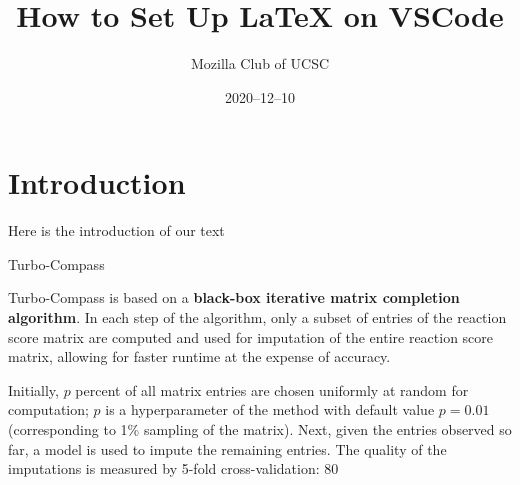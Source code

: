 \documentclass[12pt]{article}
\title{How to Set Up LaTeX on VSCode}
\author{Mozilla Club of UCSC}
\date{2020–12–10}
\begin{document}
\maketitle

\section{Introduction}

Here is the introduction of our text

Turbo-Compass

Turbo-Compass is based on a \textbf{black-box iterative matrix completion algorithm}. In each step of the algorithm, only a subset of entries of the reaction score matrix are computed and used for imputation of the entire reaction score matrix, allowing for faster runtime at the expense of accuracy.

Initially, $p$ percent of all matrix entries are chosen uniformly at random for computation; $p$ is a hyperparameter of the method with default value $p = 0.01$ (corresponding to 1\% sampling of the matrix). Next, given the entries observed so far, a model is used to impute the remaining entries. The quality of the imputations is measured by 5-fold cross-validation: 80%
\end{document}
